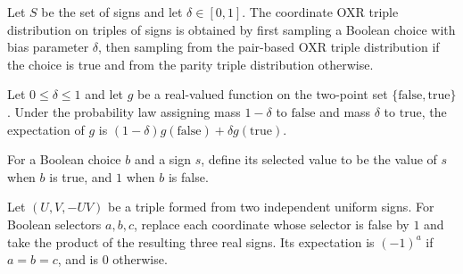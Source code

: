\begin{definition}
\label{FABL.oxrCoordinateTriplePMF}
\leanok
{}
Let $S$ be the set of signs and let $\delta\in[0,1]$. The coordinate OXR triple
distribution on triples of signs is obtained by first sampling a Boolean choice with
bias parameter $\delta$, then sampling from the pair-based OXR triple distribution if
the choice is true and from the parity triple distribution otherwise.
\end{definition}

\begin{theorem}
\label{FABL.pmfExpectation_pBiasedBitPMF_affine}
\leanok
{}
Let $0\leq \delta\leq 1$ and let $g$ be a real-valued function on the two-point set
$\{\mathrm{false},\mathrm{true}\}$. Under the probability law assigning mass $1-\delta$
to $\mathrm{false}$ and mass $\delta$ to $\mathrm{true}$, the expectation of $g$ is
$(1-\delta)g(\mathrm{false})+\delta g(\mathrm{true})$.
\end{theorem}

\begin{definition}
\label{FABL.selectedSign}
\leanok
{}
For a Boolean choice $b$ and a sign $s$, define its selected value to be the value of
$s$ when $b$ is true, and $1$ when $b$ is false.
\end{definition}

\begin{theorem}
\label{FABL.pmfExpectation_oxrParityTriplePMF_selectedSign}
\leanok
{}
Let $(U,V,-UV)$ be a triple formed from two independent uniform signs. For Boolean
selectors $a,b,c$, replace each coordinate whose selector is false by $1$ and take the
product of the resulting three real signs. Its expectation is $(-1)^a$ if $a=b=c$, and
is $0$ otherwise.
\end{theorem}


